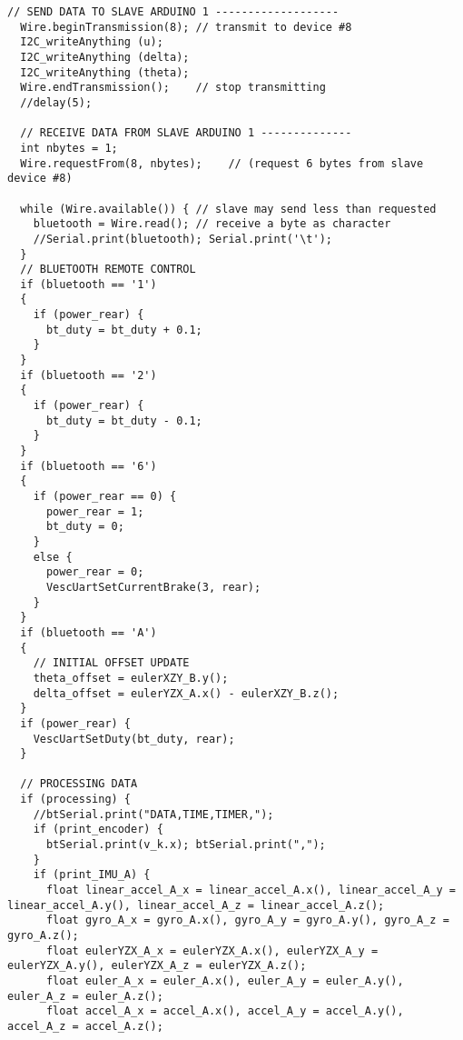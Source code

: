 \begin{lstlisting}[style=codearduino]
  // SEND DATA TO SLAVE ARDUINO 1 -------------------
  Wire.beginTransmission(8); // transmit to device #8
  I2C_writeAnything (u);
  I2C_writeAnything (delta);
  I2C_writeAnything (theta);
  Wire.endTransmission();    // stop transmitting
  //delay(5);

  // RECEIVE DATA FROM SLAVE ARDUINO 1 --------------
  int nbytes = 1;
  Wire.requestFrom(8, nbytes);    // (request 6 bytes from slave device #8)

  while (Wire.available()) { // slave may send less than requested
    bluetooth = Wire.read(); // receive a byte as character
    //Serial.print(bluetooth); Serial.print('\t');
  }
  // BLUETOOTH REMOTE CONTROL
  if (bluetooth == '1')
  {
    if (power_rear) {
      bt_duty = bt_duty + 0.1;
    }
  }
  if (bluetooth == '2')
  {
    if (power_rear) {
      bt_duty = bt_duty - 0.1;
    }
  }
  if (bluetooth == '6')
  {
    if (power_rear == 0) {
      power_rear = 1;
      bt_duty = 0;
    }
    else {
      power_rear = 0;
      VescUartSetCurrentBrake(3, rear);
    }
  }
  if (bluetooth == 'A')
  {
    // INITIAL OFFSET UPDATE
    theta_offset = eulerXZY_B.y();
    delta_offset = eulerYZX_A.x() - eulerXZY_B.z();
  }
  if (power_rear) {
    VescUartSetDuty(bt_duty, rear);
  }

  // PROCESSING DATA
  if (processing) {
    //btSerial.print("DATA,TIME,TIMER,");
    if (print_encoder) {
      btSerial.print(v_k.x); btSerial.print(",");
    }
    if (print_IMU_A) {
      float linear_accel_A_x = linear_accel_A.x(), linear_accel_A_y = linear_accel_A.y(), linear_accel_A_z = linear_accel_A.z();
      float gyro_A_x = gyro_A.x(), gyro_A_y = gyro_A.y(), gyro_A_z = gyro_A.z();
      float eulerYZX_A_x = eulerYZX_A.x(), eulerYZX_A_y = eulerYZX_A.y(), eulerYZX_A_z = eulerYZX_A.z();
      float euler_A_x = euler_A.x(), euler_A_y = euler_A.y(), euler_A_z = euler_A.z();
      float accel_A_x = accel_A.x(), accel_A_y = accel_A.y(), accel_A_z = accel_A.z();


\end{lstlisting}
